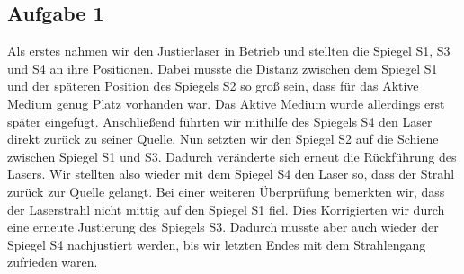 \subsection{Aufgabe 1}

Als erstes nahmen wir den Justierlaser in Betrieb und stellten die Spiegel S1, S3 und S4 an ihre Positionen. Dabei musste die Distanz zwischen dem Spiegel S1 und der späteren Position des Spiegels S2 so groß sein, dass für das Aktive Medium genug Platz vorhanden war. Das Aktive Medium wurde allerdings erst später eingefügt.
Anschließend führten wir mithilfe des Spiegels S4 den Laser direkt zurück zu seiner Quelle. Nun setzten wir den Spiegel S2 auf die Schiene zwischen Spiegel S1 und S3. Dadurch veränderte sich erneut die Rückführung des Lasers. Wir stellten also wieder mit dem Spiegel S4 den Laser so, dass der Strahl zurück zur Quelle gelangt. Bei einer weiteren Überprüfung bemerkten wir, dass der Laserstrahl nicht mittig auf den Spiegel S1 fiel. Dies Korrigierten wir durch eine erneute Justierung des Spiegels S3. Dadurch musste aber auch wieder der Spiegel S4 nachjustiert werden, bis wir letzten Endes mit dem Strahlengang zufrieden waren.